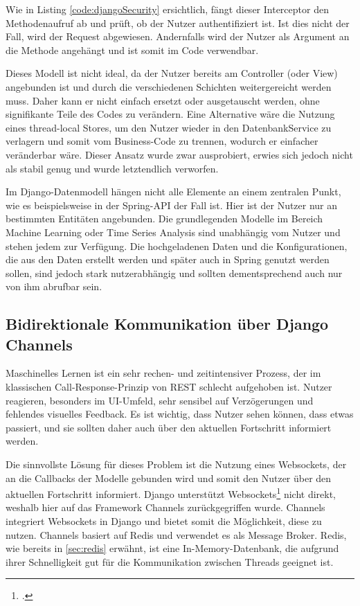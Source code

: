 Wie in Listing \ref{code:djangoSecurity} ersichtlich, fängt dieser Interceptor den Methodenaufruf ab und prüft, ob der Nutzer authentifiziert ist. Ist dies nicht der Fall, wird der Request abgewiesen. Andernfalls wird der Nutzer als Argument an die 
Methode angehängt und ist somit im Code verwendbar.

Dieses Modell ist nicht ideal, da der Nutzer bereits am Controller (oder View) angebunden ist und durch die verschiedenen Schichten weitergereicht werden muss. Daher kann er nicht einfach ersetzt oder ausgetauscht werden, ohne signifikante Teile des Codes 
zu verändern. Eine Alternative wäre die Nutzung eines thread-local Stores, um den Nutzer wieder in den DatenbankService zu verlagern und somit vom Business-Code zu trennen, wodurch er einfacher veränderbar wäre. Dieser Ansatz wurde zwar ausprobiert, 
erwies sich jedoch nicht als stabil genug und wurde letztendlich verworfen.

Im Django-Datenmodell hängen nicht alle Elemente an einem zentralen Punkt, wie es beispielsweise in der Spring-API der Fall ist. Hier ist der Nutzer nur an bestimmten Entitäten angebunden. Die grundlegenden Modelle im Bereich Machine Learning oder 
Time Series Analysis sind unabhängig vom Nutzer und stehen jedem zur Verfügung. Die hochgeladenen Daten und die Konfigurationen, die aus den Daten erstellt werden und später auch in Spring genutzt werden sollen, sind jedoch stark nutzerabhängig und sollten 
dementsprechend auch nur von ihm abrufbar sein.


\subsection{Bidirektionale Kommunikation über Django Channels}
Maschinelles Lernen ist ein sehr rechen- und zeitintensiver Prozess, der im klassischen Call-Response-Prinzip von \ac{REST} schlecht aufgehoben ist. Nutzer reagieren, besonders im \ac{UI}-Umfeld, sehr sensibel auf 
Verzögerungen und fehlendes visuelles Feedback. Es ist wichtig, dass Nutzer sehen können, dass etwas passiert, und sie sollten daher auch über den aktuellen Fortschritt informiert werden.

Die sinnvollste Lösung für dieses Problem ist die Nutzung eines Websockets, der an die Callbacks der Modelle gebunden wird und somit den Nutzer über den aktuellen Fortschritt informiert. 
Django unterstützt Websockets\footcite{https://channels.readthedocs.io/en/latest/} nicht direkt, weshalb hier auf das Framework Channels zurückgegriffen wurde. Channels integriert Websockets 
in Django und bietet somit die Möglichkeit, diese zu nutzen. Channels basiert auf Redis und verwendet es als Message Broker. Redis, wie bereits in \ref{sec:redis} erwähnt, ist eine In-Memory-Datenbank, 
die aufgrund ihrer Schnelligkeit gut für die Kommunikation zwischen Threads geeignet ist.


